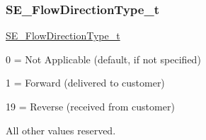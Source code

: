 \subsubsection{\texorpdfstring{S\+E\+\_\+\+Flow\+Direction\+Type\+\_\+t}{SE\_FlowDirectionType\_t}}
{\footnotesize\ttfamily \hyperlink{group__FlowDirectionType_ga83b9e4bedc8eaad2a4210b0dab7be48e}{S\+E\+\_\+\+Flow\+Direction\+Type\+\_\+t}}

0 = Not Applicable (default, if not specified)

1 = Forward (delivered to customer)

19 = Reverse (received from customer)

All other values reserved. 